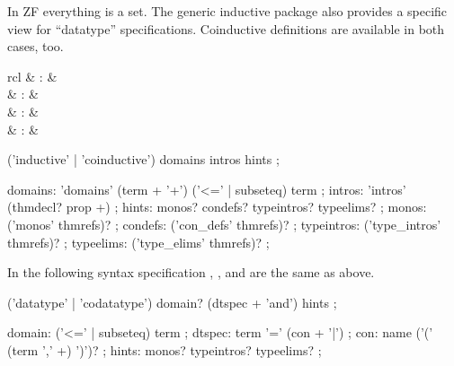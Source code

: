 \begin{isabellebody}
\begin{isamarkuptext}
\begin{descr}
  \end{descr}%
\end{isamarkuptext}%
\isamarkuptrue%
%
\isamarkuptrue%
%
\isamarkuptrue%
%
\begin{isamarkuptext}%
In ZF everything is a set.  The generic inductive package also
  provides a specific view for ``datatype'' specifications.
  Coinductive definitions are available in both cases, too.

  \begin{matharray}{rcl}
    \hypertarget{command.ZF.inductive}{\hyperlink{command.ZF.inductive}{\mbox{}}} & : &  \\
    \hypertarget{command.ZF.coinductive}{\hyperlink{command.ZF.coinductive}{\mbox{}}} & : &  \\
    \hypertarget{command.ZF.datatype}{\hyperlink{command.ZF.datatype}{\mbox{}}} & : &  \\
    \hypertarget{command.ZF.codatatype}{\hyperlink{command.ZF.codatatype}{\mbox{}}} & : &  \\
  \end{matharray}

  \begin{rail}
    ('inductive' | 'coinductive') domains intros hints
    ;

    domains: 'domains' (term + '+') ('<=' | subseteq) term
    ;
    intros: 'intros' (thmdecl? prop +)
    ;
    hints: monos? condefs? typeintros? typeelims?
    ;
    monos: ('monos' thmrefs)?
    ;
    condefs: ('con\_defs' thmrefs)?
    ;
    typeintros: ('type\_intros' thmrefs)?
    ;
    typeelims: ('type\_elims' thmrefs)?
    ;
  \end{rail}

  In the following syntax specification , , and  are the same as above.

  \begin{rail}
    ('datatype' | 'codatatype') domain? (dtspec + 'and') hints
    ;

    domain: ('<=' | subseteq) term
    ;
    dtspec: term '=' (con + '|')
    ;
    con: name ('(' (term ',' +) ')')?  
    ;
    hints: monos? typeintros? typeelims?
    ;
  \end{rail}


\end{isamarkuptext}
\end{isabellebody}
